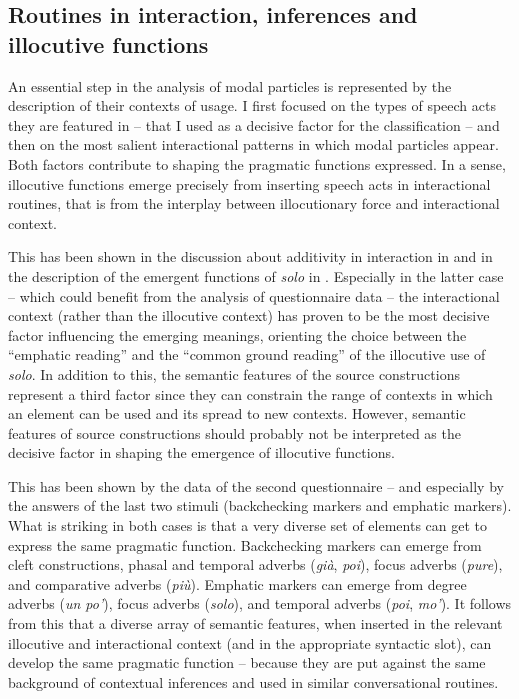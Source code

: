 \subsection{Routines in interaction, inferences and illocutive functions}
\hypertarget{Toc124860698}{}
An essential step in the analysis of modal particles is represented by the description of their contexts of usage. I first focused on the types of speech acts they are featured in – that I used as a decisive factor for the classification – and then on the most salient interactional patterns in which modal particles appear. Both factors contribute to shaping the pragmatic functions expressed. In a sense, illocutive functions emerge precisely from inserting speech acts in interactional routines, that is from the interplay between illocutionary force and interactional context.

This has been shown in the discussion about additivity in interaction in  and in the description of the emergent functions of \textit{solo} in . Especially in the latter case – which could benefit from the analysis of questionnaire data – the interactional context (rather than the illocutive context) has proven to be the most decisive factor influencing the emerging meanings, orienting the choice between the “emphatic reading” and the “common ground reading” of the illocutive use of \textit{solo}. In addition to this, the semantic features of the source constructions represent a third factor since they can constrain the range of contexts in which an element can be used and its spread to new contexts. However, semantic features of source constructions should probably not be interpreted as the decisive factor in shaping the emergence of illocutive functions.

This has been shown by the data of the second questionnaire – and especially by the answers of the last two stimuli (backchecking markers and emphatic markers). What is striking in both cases is that a very diverse set of elements can get to express the same pragmatic function. Backchecking markers can emerge from cleft constructions, phasal and temporal adverbs (\textit{già}, \textit{poi}), focus adverbs (\textit{pure}), and comparative adverbs (\textit{più}). Emphatic markers can emerge from degree adverbs (\textit{un po’}), focus adverbs (\textit{solo}), and temporal adverbs (\textit{poi}, \textit{mo’}). It follows from this that a diverse array of semantic features, when inserted in the relevant illocutive and interactional context (and in the appropriate syntactic slot), can develop the same pragmatic function – because they are put against the same background of contextual inferences and used in similar conversational routines.

